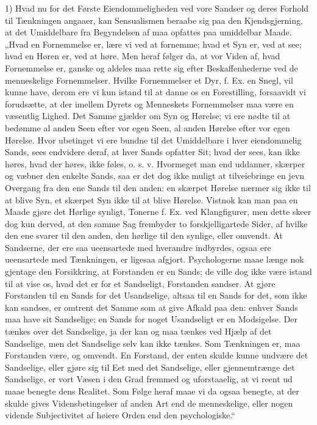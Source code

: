 \documentclass[11pt]{book}
\newcommand{\opage}[1]{\marginnote{\footnotesize\textit{[#1]}}}
\begin{document}
\opage{244} \setcounter{footnote}{0}%
1) Hvad nu for det Første Eiendommeligheden ved vore Sandser og deres
Forhold til Tænkningen angaaer, kan Sensualismen beraabe sig paa den
Kjendsgjerning, at det Umiddelbare fra Begyndelsen af maa opfattes paa
umiddelbar Maade. „Hvad en Fornemmelse er, lære vi ved at fornemme;
hvad et Syn er, ved at see; hvad en Høren er, ved at høre. Men heraf
følger da, at vor Viden af, hvad Fornemmelse er, ganske og aldeles maa
rette sig efter Beskaffenhederne ved de menneskelige Fornemmelser.
Hvilke Fornemmelser et Dyr, f. Ex. en Snegl, vil kunne have, derom ere
vi kun istand til at danne os en Forestilling, forsaavidt vi forudsætte,
at der imellem Dyrets og Menneskets Fornemmelser maa være en væsentlig
Lighed. Det Samme gjælder om Syn og Hørelse; vi ere nødte til at
bedømme al anden Seen efter vor egen Seen, al anden Hørelse efter vor
egen Hørelse. Hvor ubetinget vi ere bundne til det Umiddelbare i hver
eiendommelig Sands, sees endvidere deraf, at hver Sands opfatter Sit;
hvad der sees, kan ikke høres, hvad der høres, ikke føles, o. s. v.
Hvormeget man end uddanner, skærper og væbner den enkelte Sands, saa er
det dog ikke muligt at tilveiebringe en jevn Overgang fra den ene Sands
til den anden: en skærpet Hørelse nærmer sig ikke til at blive Syn, et
skærpet Syn ikke til at blive Hørelse. Vistnok kan man paa en Maade
gjøre det Hørlige synligt, Tonerne f. Ex. ved Klangfigurer, men dette
skeer dog kun derved, at den samme Sag frembyder to forskjelligartede
Sider, af hvilke den ene svarer til den anden, den hørlige til den
synlige, eller omvendt. At Sandserne, der ere saa ueensartede med
hverandre indbyrdes, ogsaa ere ueensartede med Tænkningen, er ligesaa
afgjort. Psychologerne maae længe nok gjentage den Forsikkring, at
Forstanden er en Sands; de ville dog ikke være istand til at vise os,
hvad det er for et Sandseligt, Forstanden sandser. At gjøre Forstanden
til en Sands for det Usandselige, altsaa til en Sands for det, som ikke
kan sandses, er omtrent det
\opage{245} \setcounter{footnote}{0}%
Samme som at give Afkald paa den: enhver Sands maa have sit
Sandselige; en Sands for noget Usandseligt er en Modsigelse. Der
tænkes over det Sandselige, ja der kan og maa tænkes ved Hjælp af det
Sandselige, men det Sandselige selv kan ikke tænkes.
Som Tænkningen er, maa Forstanden være, og omvendt. En Forstand, der
enten skulde kunne undvære det Sandselige, eller gjøre sig til Eet med
det Sandselige, eller gjennemtrænge det Sandselige, er vort Væsen i
den Grad fremmed og uforstaaelig, at vi reent ud maae benegte dens
Realitet. Som Følge heraf maae vi da ogsaa benegte, at der skulde
gives Vidensbetingelser af anden Art end de menneskelige, eller nogen
vidende Subjectivitet af høiere Orden end den psychologiske.“
\end{document}
